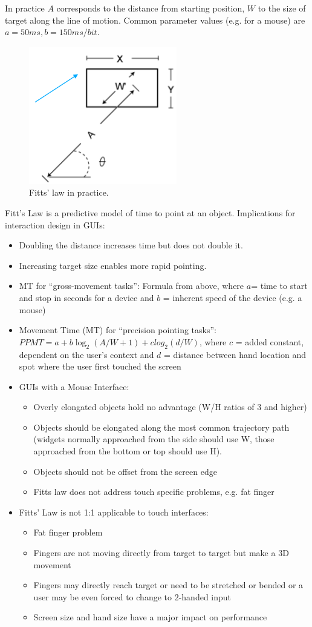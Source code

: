In practice $A$ corresponds to the distance from starting position, $W$ to the size of target along the line of motion. Common parameter values (e.g. for a mouse) are $a=50ms, b=150ms/bit$.
\begin{figure}[h!]
	\centering
	\includegraphics[width=.2\textwidth]{img/ch05_fitt1.png}
	\caption{Fitts' law in practice.}
	\label{fitt1}
\end{figure}
Fitt's Law is a predictive model of time to point at an object. Implications for interaction design in GUIs:
\begin{itemize}
\item Doubling the distance increases time but does not double it.
\item Increasing target size enables more rapid pointing.
\item MT for ``gross-movement tasks'': Formula from above, where $a$= time to start and stop in seconds for a device and $b$ = inherent speed of the device (e.g. a mouse)
\item Movement Time (MT) for ``precision pointing tasks'': $PPMT = a + b \log_2 (A/W + 1) + c log_2 (d/W)$, where $c$ = added constant, dependent on the user's context and $d$ = distance between hand location and spot where the user first touched the screen
\item GUIs with a Mouse Interface: 
\begin{itemize}
\item Overly elongated objects hold no advantage (W/H ratios of 3 and higher)
\item Objects should be elongated along the most common trajectory path (widgets normally approached from the side should use W, those approached from the bottom or top should use H).
\item Objects should not be offset from the screen edge
\item Fitts law does not address touch specific problems, e.g. fat finger
\end{itemize}
\item Fitts' Law is not 1:1 applicable to touch interfaces:
\begin{itemize}
\item Fat finger problem
\item Fingers are not moving directly from target to target but make a 3D movement
\item Fingers may directly reach target or need to be stretched or bended or a user may be even forced to change to 2-handed input
\item Screen size and hand size have a major impact on performance
\end{itemize}
\end{itemize} 
